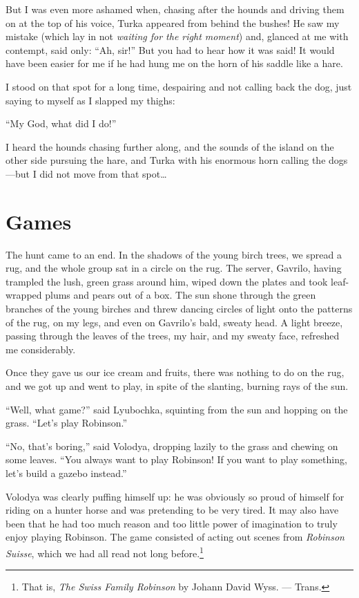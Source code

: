 But I was even more ashamed when, chasing after the hounds and driving them on at the top of his voice, Turka appeared from behind the bushes! He saw my mistake (which lay in not \emph{waiting for the right moment}) and, glanced at me with contempt, said only: ``Ah, sir!'' But you had to hear how it was said! It would have been easier for me if he had hung me on the horn of his saddle like a hare.

I stood on that spot for a long time, despairing and not calling back the dog, just saying to myself as I slapped my thighs:

``My God, what did I do!'' %

I heard the hounds chasing further along, and the sounds of the island on the other side pursuing the hare, and Turka with his enormous horn calling the dogs---but I did not move from that spot\ldots{}

\chapter{Games}

The hunt came to an end. In the shadows of the young birch trees, we spread a rug, and the whole group sat in a circle on the rug. The server, Gavrilo, having trampled the lush, green grass around him, wiped down the plates and took leaf-wrapped plums and pears out of a box. The sun shone through the green branches of the young birches and threw dancing circles of light onto the patterns of the rug, on my legs, and even on Gavrilo's bald, sweaty head. A light breeze, passing through the leaves of the trees, my hair, and my sweaty face, refreshed me considerably.

Once they gave us our ice cream and fruits, there was nothing to do on the rug, and we got up and went to play, in spite of the slanting, burning rays of the sun.

``Well, what game?'' said Lyubochka, squinting from the sun and hopping on the grass. ``Let's play Robinson.'' %

``No, that's boring,'' said Volodya, dropping lazily to the grass and chewing on some leaves. ``You always want to play Robinson! If you want to play something, let's build a gazebo instead.'' %

Volodya was clearly puffing himself up: he was obviously so proud of himself for riding on a hunter horse and was pretending to be very tired. It may also have been that he had too much reason and too little power of imagination to truly enjoy playing Robinson. The game consisted of acting out scenes from \textit{Robinson Suisse}, which we had all read not long before.\footnote{That is, \textit{The Swiss Family Robinson} by Johann David Wyss. --- Trans.}

